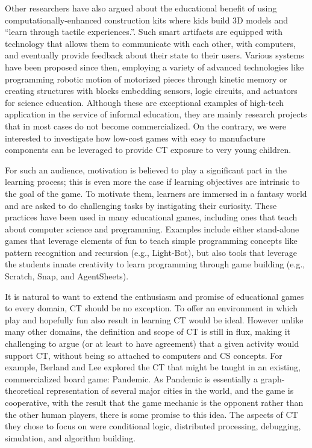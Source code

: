 \documentclass{acm_proc_article-sp}
\begin{document}
Other researchers have also argued about the educational benefit of using computationally-enhanced construction kits where kids build 3D models and “learn through tactile experiences.”. Such smart artifacts are equipped with technology that allows them to communicate with each other, with computers, and eventually provide feedback about their state to their users. Various systems have been proposed since then, employing a variety of advanced technologies like programming robotic motion of motorized pieces through kinetic memory or creating structures with blocks embedding sensors, logic circuits, and actuators for science education. Although these are exceptional examples of high-tech application in the service of informal education, they are mainly research projects that in most cases do not become commercialized. On the contrary, we were interested to investigate how low-cost games with easy to manufacture components can be leveraged to provide CT exposure to very young children. 

For such an audience, motivation is believed to play a significant part in the learning process; this is even more the case if learning objectives are intrinsic to the goal of the game. To motivate them, learners are immersed in a fantasy world and are asked to do challenging tasks by instigating their curiosity. These practices have been used in many educational games, including ones that teach about computer science and programming. Examples include either stand-alone games that leverage elements of fun to teach simple programming concepts like pattern recognition and recursion (e.g., Light-Bot), but also tools that leverage the students innate creativity to learn programming through game building (e.g., Scratch, Snap, and AgentSheets).

It is natural to want to extend the enthusiasm and promise of educational games to every domain, CT should be no exception. To offer an environment in which play and hopefully fun also result in learning CT would be ideal. However unlike many other domains, the definition and scope of CT is still in flux, making it challenging to argue (or at least to have agreement) that a given activity would support CT, without being so attached to computers and CS concepts. For example, Berland and Lee explored the CT that might be taught in an existing, commercialized board game: Pandemic. As Pandemic is essentially a graph-theoretical representation of several major cities in the world, and the game is cooperative, with the result that the game mechanic is the opponent rather than the other human players, there is some promise to this idea. The aspects of CT they chose to focus on were conditional logic, distributed processing, debugging, simulation, and algorithm building. 
\end{document}
